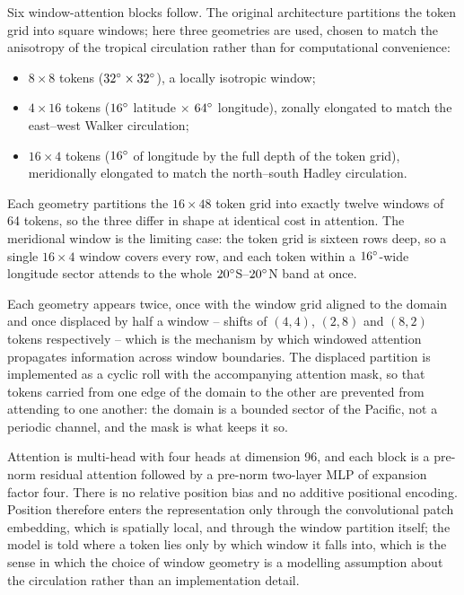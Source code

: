 Six window-attention blocks follow. The original architecture partitions the token grid into
square windows; here three geometries are used, chosen to match the anisotropy of the tropical
circulation rather than for computational convenience:

\begin{itemize}
  \item $8\times8$ tokens ($32^{\circ}\times32^{\circ}$), a locally isotropic window;
  \item $4\times16$ tokens ($16^{\circ}$ latitude $\times$ $64^{\circ}$ longitude), zonally elongated
        to match the east--west Walker circulation;
  \item $16\times4$ tokens ($16^{\circ}$ of longitude by the full depth of the token grid),
        meridionally elongated to match the north--south Hadley circulation.
\end{itemize}

Each geometry partitions the $16\times48$ token grid into exactly twelve windows of 64 tokens,
so the three differ in shape at identical cost in attention. The meridional window is the
limiting case: the token grid is sixteen rows deep, so a single $16\times4$ window covers every
row, and each token within a $16^{\circ}$-wide longitude sector attends to the whole
$20^{\circ}$S--$20^{\circ}$N band at once.

Each geometry appears twice, once with the window grid aligned to the domain and once displaced
by half a window -- shifts of $(4,4)$, $(2,8)$ and $(8,2)$ tokens respectively -- which is the
mechanism by which windowed attention propagates information across window boundaries. The
displaced partition is implemented as a cyclic roll with the accompanying attention mask, so
that tokens carried from one edge of the domain to the other are prevented from attending to
one another: the domain is a bounded sector of the Pacific, not a periodic channel, and the
mask is what keeps it so.

Attention is multi-head with four heads at dimension 96, and each block is a pre-norm residual
attention followed by a pre-norm two-layer MLP of expansion factor four. There is no relative
position bias and no additive positional encoding. Position therefore enters the representation
only through the convolutional patch embedding, which is spatially local, and through the
window partition itself; the model is told where a token lies only by which window it falls
into, which is the sense in which the choice of window geometry is a modelling assumption about
the circulation rather than an implementation detail.

